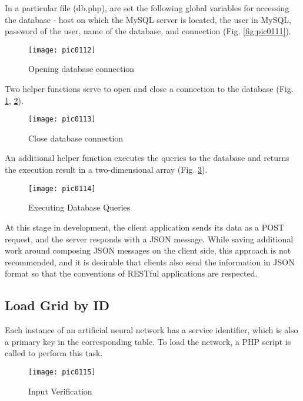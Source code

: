 In a particular file (db.php), are set the following global variables for accessing the database - host on which the MySQL server is located, the user in MySQL, password of the user, name of the database, and connection (Fig. \ref{fig:pic0111}).

\begin{figure}[h]
\centering
\texttt{[image: pic0112]}
\caption{Opening database connection}
\label{fig:pic0112}
\end{figure}
\FloatBarrier

Two helper functions serve to open and close a connection to the database (Fig. \ref{fig:pic0112}, \ref{fig:pic0113}).

\begin{figure}[h]
\centering
\texttt{[image: pic0113]}
\caption{Close database connection}
\label{fig:pic0113}
\end{figure}
\FloatBarrier

An additional helper function executes the queries to the database and returns the execution result in a two-dimensional array (Fig. \ref{fig:pic0114}).

\begin{figure}[h]
\centering
\texttt{[image: pic0114]}
\caption{Executing Database Queries}
\label{fig:pic0114}
\end{figure}
\FloatBarrier

At this stage in development, the client application sends its data as a POST request, and the server responds with a JSON message. While saving additional work around composing JSON messages on the client side, this approach is not recommended, and it is desirable that clients also send the information in JSON format so that the conventions of RESTful applications are respected.

\subsection{Load Grid by ID}

Each instance of an artificial neural network has a service identifier, which is also a primary key in the corresponding table. To load the network, a PHP script is called to perform this task.

\begin{figure}[h]
\centering
\texttt{[image: pic0115]}
\caption{Input Verification}
\label{fig:pic0115}
\end{figure}
\FloatBarrier

